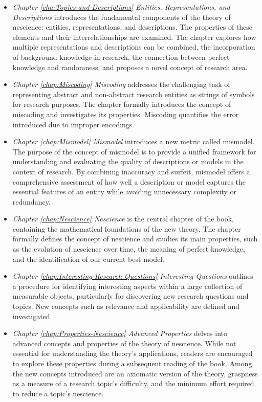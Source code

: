 \begin{itemize}

\item \emph{Chapter \ref{cha:Topics-and-Descriptions} Entities, Representations, and Descriptions} introduces the fundamental components of the theory of nescience: entities, representations, and descriptions. The properties of these elements and their interrelationships are examined. The chapter explores how multiple representations and descriptions can be combined, the incorporation of background knowledge in research, the connection between perfect knowledge and randomness, and proposes a novel concept of research area.

\item \emph{Chapter \ref{chap:Miscoding} Miscoding} addresses the challenging task of representing abstract and non-abstract research entities as strings of symbols for research purposes. The chapter formally introduces the concept of miscoding and investigates its properties. Miscoding quantifies the error introduced due to improper encodings.

\item \emph{Chapter \ref{chap:Mismodel} Mismodel} introduces a new metric called mismodel. The purpose of the concept of mismodel is to provide a unified framework for understanding and evaluating the quality of descriptions or models in the context of research. By combining inaccuracy and surfeit, mismodel offers a comprehensive assessment of how well a description or model captures the essential features of an entity while avoiding unnecessary complexity or redundancy. 

\item \emph{Chapter \ref{chap:Nescience} Nescience} is the central chapter of the book, containing the mathematical foundations of the new theory. The chapter formally defines the concept of nescience and studies its main properties, such as the evolution of nescience over time, the meaning of perfect knowledge, and the identification of our current best model.

\item \emph{Chapter \ref{chap:Interesting-Research-Questions} Interesting Questions} outlines a procedure for identifying interesting aspects within a large collection of measurable objects, particularly for discovering new research questions and topics. New concepts such as relevance and applicability are defined and investigated.

\item \emph{Chapter \ref{chap:Properties-Nescience} Advanced Properties} delves into advanced concepts and properties of the theory of nescience. While not essential for understanding the theory's applications, readers are encouraged to explore these properties during a subsequent reading of the book. Among the new concepts introduced are an axiomatic version of the theory, graspness as a measure of a research topic's difficulty, and the minimum effort required to reduce a topic's nescience.

\end{itemize}

